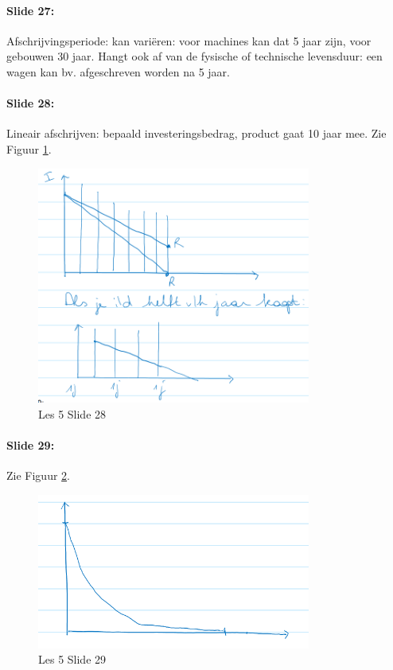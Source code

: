 \documentclass[10pt,a4paper]{report}
\begin{document}
\paragraph{Slide 27:} Afschrijvingsperiode: kan vari\"eren: voor machines kan dat 5 jaar zijn, voor gebouwen 30 jaar. Hangt ook af van de fysische of technische levensduur: een wagen kan bv. afgeschreven worden na 5 jaar. %

\paragraph{Slide 28:} Lineair afschrijven: bepaald investeringsbedrag, product gaat 10 jaar mee. Zie Figuur \ref{les05_06}.

\begin{figure}[h!]
\centering
\includegraphics[width=90mm]{Les05_06.png}
\caption{Les 5 Slide 28} 
\label{les05_06}
\end{figure}

\paragraph{Slide 29:} Zie Figuur \ref{les05_07}.

\begin{figure}[h!]
\centering
\includegraphics[width=90mm]{Les05_07.png}
\caption{Les 5 Slide 29} 
\label{les05_07}
\end{figure}
\end{document}
